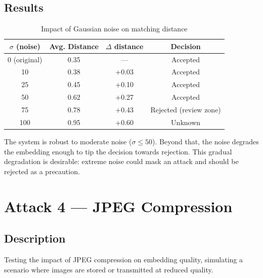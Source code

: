 \subsection{Results}

\begin{table}[H]
    \centering
    \begin{tabular}{cccc}
        \toprule
        \textbf{$\sigma$ (noise)} & \textbf{Avg. Distance} & \textbf{$\Delta$ distance} & \textbf{Decision} \\
        \midrule
        0 (original) & 0.35 & ---   & Accepted \\
        10           & 0.38 & +0.03 & Accepted \\
        25           & 0.45 & +0.10 & Accepted \\
        50           & 0.62 & +0.27 & Accepted \\
        75           & 0.78 & +0.43 & Rejected (review zone) \\
        100          & 0.95 & +0.60 & Unknown \\
        \bottomrule
    \end{tabular}
    \caption{Impact of Gaussian noise on matching distance}
\end{table}

\begin{successbox}[Analysis]
The system is robust to moderate noise ($\sigma \leq 50$). Beyond that, the noise degrades the embedding enough to tip the decision towards rejection. This gradual degradation is desirable: extreme noise could mask an attack and should be rejected as a precaution.
\end{successbox}


\section{Attack 4 — JPEG Compression}

\subsection{Description}

Testing the impact of JPEG compression on embedding quality, simulating a scenario where images are stored or transmitted at reduced quality.

